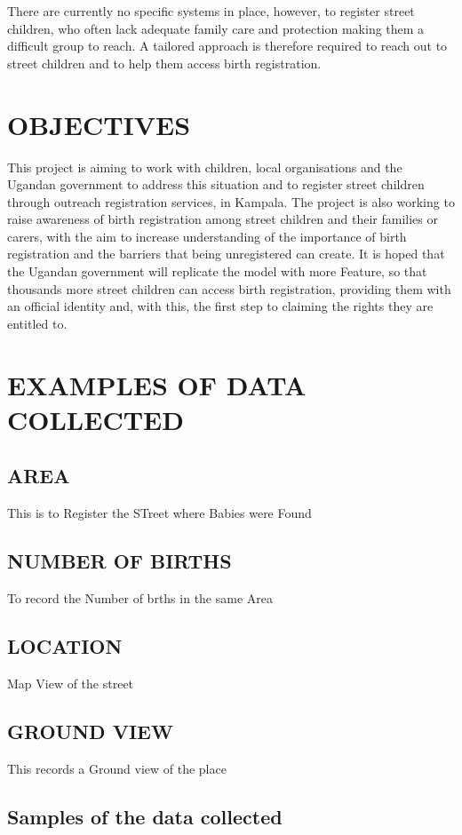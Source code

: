 \documentclass{article}
\begin{document}
There are currently no specific systems in place, however, to register street children, who often lack adequate family care and protection making them a difficult group to reach. A tailored approach is therefore required to reach out to street children and to help them access birth registration.


\section{OBJECTIVES}
This project is aiming to work with children, local organisations and the Ugandan government to address this situation and to register street children through outreach registration services, in Kampala. The project is also working to raise awareness of birth registration among street children and their families or carers, with the aim to increase understanding of the importance of birth registration and the barriers that being unregistered can create. It is hoped that the Ugandan government will replicate the model with more Feature, so that thousands more street children can access birth registration, providing them with an official identity and, with this, the first step to claiming the rights they are entitled to. 


\section{EXAMPLES OF DATA COLLECTED}

\subsection {AREA}
This is to Register the STreet where Babies were Found

 
\subsection {NUMBER OF BIRTHS}
To record the Number of brths in the same Area 
 
\subsection {LOCATION} 
Map View of the street

\subsection {GROUND VIEW}
This records a Ground view  of the place  

\cleardoublepage
\subsection {Samples of the data collected}
\end{document}
